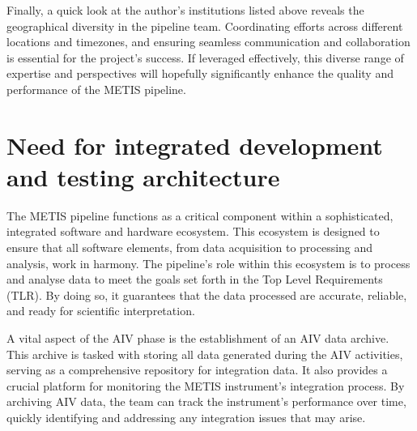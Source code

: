 \documentclass[a4paper]{spie}  %
\begin{document}
Finally, a quick look at the author's institutions listed above reveals the geographical diversity in the pipeline team.
Coordinating efforts across different locations and timezones, and ensuring seamless communication and collaboration is essential for the project's success. 
If leveraged effectively, this diverse range of expertise and perspectives will hopefully significantly enhance the quality and performance of the METIS pipeline.




\section{Need for integrated development and testing architecture}
\label{sec:dev}



The METIS pipeline functions as a critical component within a sophisticated, integrated software and hardware ecosystem. This ecosystem is designed to ensure that all software elements, from data acquisition to processing and analysis, work in harmony. The pipeline's role within this ecosystem is to process and analyse data to meet the goals set forth in the Top Level Requirements (TLR). By doing so, it guarantees that the data processed are accurate, reliable, and ready for scientific interpretation.

A vital aspect of the AIV phase is the establishment of an AIV data archive. This archive is tasked with storing all data generated during the AIV activities, serving as a comprehensive repository for integration data. It also provides a crucial platform for monitoring the METIS instrument's integration process. By archiving AIV data, the team can track the instrument's performance over time, quickly identifying and addressing any integration issues that may arise.
\end{document}
